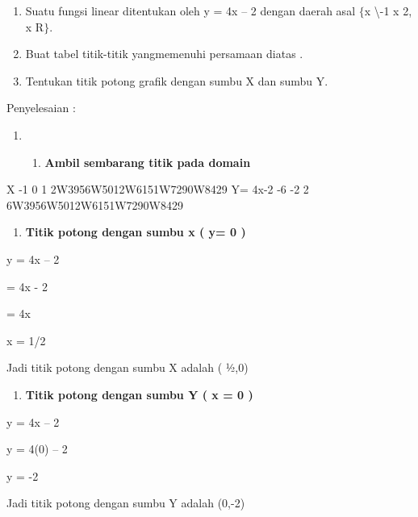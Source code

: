 \documentclass[11pt,fleqn]{book} %
\begin{document}
\begin{myEnumerate}
\begin{itemize}
\begin{enumerate}
\item  Suatu fungsi linear ditentukan oleh y = 4x -- 2 dengan daerah asal $\{$x {\textbackslash}-1    x    2, x    R$\}$.

\item  Buat tabel titik-titik yangmemenuhi persamaan diatas .

\item  Tentukan titik potong grafik dengan sumbu X dan sumbu Y.
\end{enumerate}

\noindent Penyelesaian :

\begin{enumerate}
\item \begin{enumerate}
\item  \textbf{Ambil sembarang titik pada domain}
\end{enumerate}
\end{enumerate}

\noindent 

 X -1 0 1 2W3956W5012W6151W7290W8429 Y= 4x-2 -6 -2 2 6W3956W5012W6151W7290W8429

\begin{enumerate}
\item  \textbf{Titik potong dengan sumbu x ( y= 0 )}
\end{enumerate}

\noindent \textbf{}

\noindent y = 4x -- 2

 = 4x - 2

 = 4x

\noindent x =  1/2

\noindent Jadi titik potong dengan sumbu X adalah ( ½,0)

\noindent 

\begin{enumerate}
\item  \textbf{Titik potong dengan sumbu Y ( x = 0 )}
\end{enumerate}

\noindent y = 4x -- 2

\noindent y = 4(0) -- 2

\noindent y = -2

\noindent Jadi titik potong dengan sumbu Y adalah (0,-2)

\noindent 

\noindent 

\noindent


\end{itemize}
\end{myEnumerate}
\end{document}
